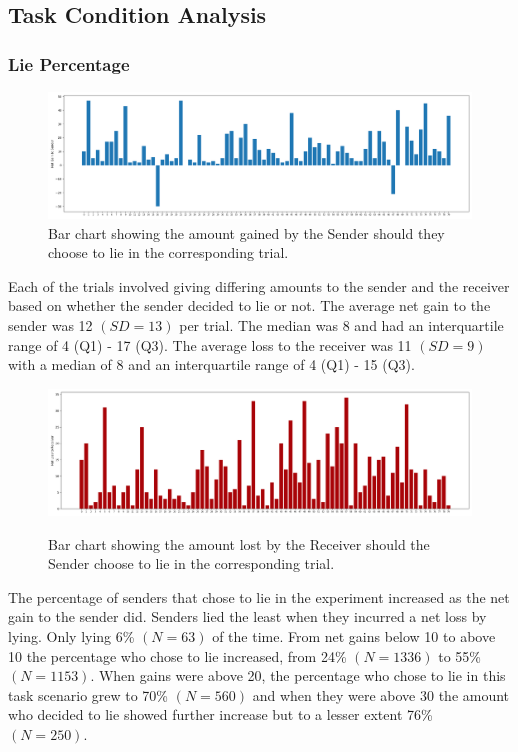 \documentclass[man, floatsintext]{apa7}
\begin{document}
\subsection{Task Condition Analysis}

\subsubsection{Lie Percentage}

\begin{figure}[H]
	\includegraphics[width=\linewidth]{../plots/TrialIndex/Gains.png}
	\caption{Bar chart showing the amount gained by the Sender should they choose to lie in the corresponding trial.}
	\label{fig:Gains}
\end{figure}

Each of the trials involved giving differing amounts to the sender and the receiver based on whether the sender decided to lie or not. The average net gain to the sender was 12 $(SD = 13)$ per trial. The median was 8 and had an interquartile range of 4 (Q1) - 17 (Q3). The average loss to the receiver was 11 $(SD = 9)$ with a median of 8 and an interquartile range of 4 (Q1) - 15 (Q3).

\begin{figure}[H]
	\caption{Bar chart showing the amount lost by the Receiver should the Sender choose to lie in the corresponding trial.}
	\includegraphics[width=\linewidth]{../plots/TrialIndex/Losses.png}
	\label{fig:Losses}
\end{figure}

The percentage of senders that chose to lie in the experiment increased as the net gain to the sender did.  Senders lied the least when they incurred a net loss by lying. Only lying 6\% $(N = 63)$ of the time. From net gains below 10 to above 10 the percentage who chose to lie increased, from 24\% $(N = 1336)$ to 55\% $(N = 1153)$. When gains were above 20, the percentage who chose to lie in this task scenario grew to 70\% $(N = 560)$ and when they were above 30 the amount who decided to lie showed further increase but to a lesser extent 76\% $(N = 250)$.
\end{document}
